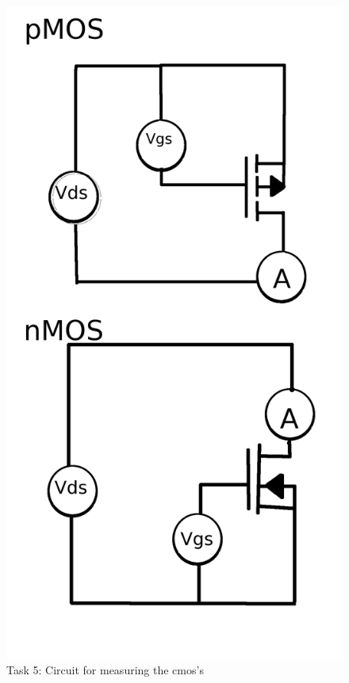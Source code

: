 \documentclass[11pt,a4paper]{report}
\begin{document}
\begin{figure}[ht!]
\caption{Task 5: Circuit for measuring the cmos's}
\centering
\includegraphics[scale=0.2]{task5.png}
\end{figure}
\end{document}
